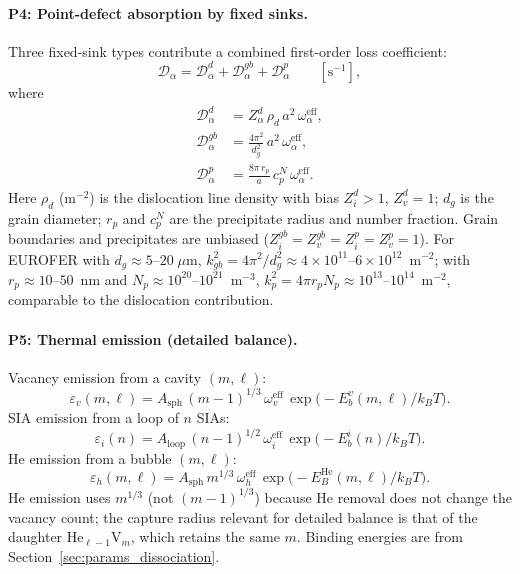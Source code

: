 \paragraph{P4: Point-defect absorption by fixed sinks.}
Three fixed-sink types contribute a combined first-order loss coefficient:
\begin{equation}\label{eq:D_total}
    \mathcal{D}_\alpha
    = \mathcal{D}_\alpha^d + \mathcal{D}_\alpha^{gb}
    + \mathcal{D}_\alpha^p
    \qquad [\text{s}^{-1}],
\end{equation}
where
\begin{align}
    \mathcal{D}_\alpha^d
    &= Z_\alpha^d\,\rho_d\,a^2\,\omega_\alpha^{\mathrm{eff}},
    \label{eq:P4d}\\[2pt]
    \mathcal{D}_\alpha^{gb}
    &= \frac{4\pi^2}{d_g^2}\,a^2\,\omega_\alpha^{\mathrm{eff}},
    \label{eq:P4gb}\\[2pt]
    \mathcal{D}_\alpha^p
    &= \frac{8\pi\,r_p}{a}\,c_p^N\,\omega_\alpha^{\mathrm{eff}}.
    \label{eq:P4p}
\end{align}
Here $\rho_d$ (m$^{-2}$) is the dislocation line density with bias
$Z_i^d > 1$, $Z_v^d = 1$; $d_g$ is the grain diameter; $r_p$ and
$c_p^N$ are the precipitate radius and number fraction. Grain boundaries
and precipitates are unbiased ($Z_i^{gb} = Z_v^{gb} = Z_i^p = Z_v^p =
1$). For EUROFER with $d_g \approx 5$--$20\;\mu$m,
$k_{gb}^2 = 4\pi^2/d_g^2 \approx 4\times10^{11}$--$6\times10^{12}$~m$^{-2}$;
with $r_p \approx 10$--$50$~nm and $N_p \approx 10^{20}$--$10^{21}$~m$^{-3}$,
$k_p^2 = 4\pi r_p N_p \approx 10^{13}$--$10^{14}$~m$^{-2}$, comparable to
the dislocation contribution.

\paragraph{P5: Thermal emission (detailed balance).}
Vacancy emission from a cavity $(m,\ell)$:
\begin{equation}\label{eq:P5v}
    \varepsilon_v(m,\ell)
    = A_{\mathrm{sph}}\,(m{-}1)^{1/3}\,\omega_v^{\mathrm{eff}}\,
      \exp\!\bigl(-E_b^v(m,\ell)/k_BT\bigr).
\end{equation}
SIA emission from a loop of $n$ SIAs:
\begin{equation}\label{eq:P5i}
    \varepsilon_i(n)
    = A_{\mathrm{loop}}\,(n{-}1)^{1/2}\,\omega_i^{\mathrm{eff}}\,
      \exp\!\bigl(-E_b^i(n)/k_BT\bigr).
\end{equation}
He emission from a bubble $(m,\ell)$:
\begin{equation}\label{eq:P5h}
    \varepsilon_h(m,\ell)
    = A_{\mathrm{sph}}\,m^{1/3}\,\omega_h^{\mathrm{eff}}\,
      \exp\!\bigl(-E_B^{\mathrm{He}}(m,\ell)/k_BT\bigr).
\end{equation}
He emission uses $m^{1/3}$ (not $(m{-}1)^{1/3}$) because He removal
does not change the vacancy count; the capture radius relevant for
detailed balance is that of the daughter He$_{\ell-1}$V$_m$, which
retains the same $m$. Binding energies are from
Section~\ref{sec:params_dissociation}.

